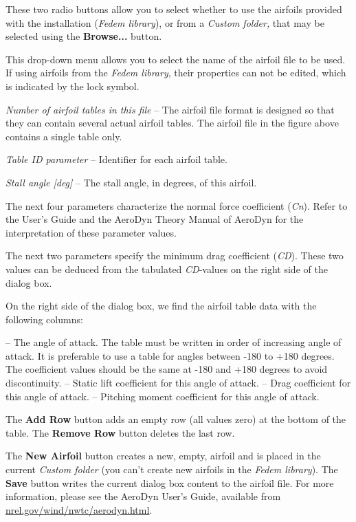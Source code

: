 \begin{bulletlist}
\item
  These two radio buttons allow you to select whether to use the
  airfoils provided with the installation ({\sl Fedem library}),
  or from a {\sl Custom folder,} that may be selected using the
  \textbf{Browse...} button.
\item
  This drop-down menu allows you to select the name of the airfoil file
  to be used. If using airfoils from the {\sl Fedem library}, their
  properties can not be edited, which is indicated by the lock symbol.
\item{\sl Number of airfoil tables in this file} --
  The airfoil file format is designed so that they can contain
  several actual airfoil tables.
  The airfoil file in the figure above contains a single table only.
\item{\sl Table ID parameter} --
  Identifier for each airfoil table.
\item{\sl Stall angle [deg]} --
  The stall angle, in degrees, of this airfoil.
\item
  The next four parameters characterize the normal force coefficient ({\sl Cn}).
  Refer to the User's Guide and the AeroDyn Theory Manual of AeroDyn
  for the interpretation of these parameter values.
\item
  The next two parameters specify the minimum drag coefficient ({\sl CD}).
  These two values can be deduced from the tabulated {\sl CD}-values
  on the right side of the dialog box.
\item
  On the right side of the dialog box, we find the airfoil table data
  with the following columns:
  \begin{itemize}
   -- The angle of attack.
    The table must be written in order of increasing angle of attack.
    It is preferable to use a table for angles between -180 to +180 degrees.
    The coefficient values should be the same at -180 and +180 degrees
    to avoid discontinuity.
   -- Static lift coefficient for this angle of attack.
   -- Drag coefficient for this angle of attack.
   -- Pitching moment coefficient for this angle of attack.
  \end{itemize}
  The \textbf{Add Row} button adds an empty row (all values zero) at the bottom
  of the table. The \textbf{Remove Row} button deletes the last row.
\end{bulletlist}

The \textbf{New Airfoil} button creates a new, empty,
airfoil and is placed in the current {\sl Custom folder}
(you can't create new airfoils in the {\sl Fedem library}).
The \textbf{Save} button writes the current dialog box content to the
airfoil file.
For more information, please see the AeroDyn User's Guide, available from
\href{https://www.nrel.gov/wind/nwtc/aerodyn.html}
     {nrel.gov/wind/nwtc/aerodyn.html}.

